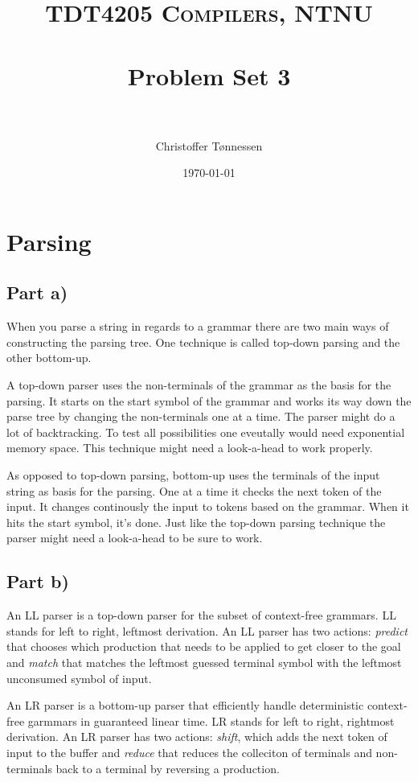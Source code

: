 \documentclass[paper=a4, fontsize=11pt]{scrartcl} %
\title{ 
\normalfont \normalsize 
\textsc{TDT4205 Compilers, NTNU} \\ [25pt] %
\horrule{0.5pt} \\[0.4cm] %
\huge Problem Set 3 \\ %
\horrule{2pt} \\[0.5cm] %
}
\author{Christoffer Tønnessen} %
\date{\normalsize\today} %
\numberwithin{equation}{section} %
\numberwithin{figure}{section} %
\numberwithin{table}{section} %
\begin{document}
\maketitle %

\section{Parsing}
\subsection{Part a)}
When you parse a string in regards to a grammar there are two main ways of constructing the parsing tree. One technique is called top-down parsing and the other bottom-up.

A top-down parser uses the non-terminals of the grammar as the basis for the parsing. It starts on the start symbol of the grammar and works its way down the parse tree by changing the non-terminals one at a time. The parser might do a lot of backtracking. To test all possibilities one eveutally would need exponential memory space. This technique might need a look-a-head to work properly.

As opposed to top-down parsing, bottom-up uses the terminals of the input string as basis for the parsing. One at a time it checks the next token of the input. It changes continously the input to tokens based on the grammar. When it hits the start symbol, it's done. Just like the top-down parsing technique the parser might need a look-a-head to be sure to work.
\subsection{Part b)}
An LL parser is a top-down parser for the subset of context-free grammars. LL stands for left to right, leftmost derivation. An LL parser has two actions: \textit{predict} that chooses which production that needs to be applied to get closer to the goal and \textit{match} that matches the leftmost guessed terminal symbol with the leftmost unconsumed symbol of input.

An LR parser is a bottom-up parser that efficiently handle deterministic context-free garmmars in guaranteed linear time. LR stands for left to right, rightmost derivation. An LR parser has two actions: \textit{shift}, which adds the next token of input to the buffer and \textit{reduce} that reduces the colleciton of terminals and non-terminals back to a terminal by reversing a production.
\end{document}
